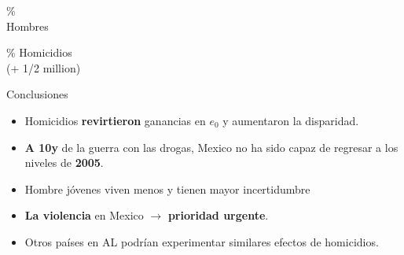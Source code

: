 \documentclass[xcolor={dvipsnames}]{beamer}
\begin{document}
\begin{frame}
\Huge{
\begin{center}
{\fontsize{70}{80}\%}\\
Hombres

\end{center}
}
\end{frame}


\begin{frame}
\Huge{
\begin{center}
{\fontsize{70}{80}\% Homicidios}\\
(+ 1/2 million)

\end{center}
}
\end{frame}


\begin{frame}
\Large{
Conclusiones \pause

		\begin{itemize}
		
		\item Homicidios \textbf{revirtieron} ganancias en $e_0$ y aumentaron la disparidad. \pause

		\item \textbf{A 10y} de la guerra con las drogas, Mexico no ha sido capaz de regresar a los niveles de \textbf{2005}. \pause
		
		\item Hombre j\'ovenes viven menos y tienen mayor incertidumbre \pause
		
		\item \textbf{La violencia} en Mexico $\longrightarrow$ \textbf{prioridad urgente}. \pause
		
		\item Otros pa\'ises en AL podr\'ian experimentar similares efectos de homicidios.
						
		\end{itemize}

}
\end{frame}






\end{document}
